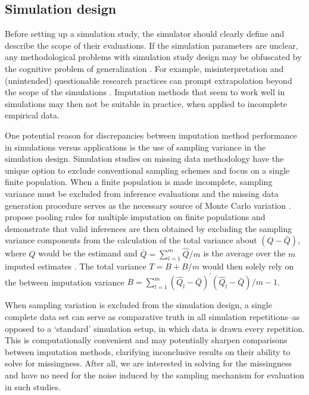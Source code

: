 \documentclass[bimj,fleqn]{w-art}
\begin{document}

\subsection{Simulation design}

Before setting up a simulation study, the simulator should clearly define and describe the scope of their evaluations. If the simulation parameters are unclear, any methodological problems with simulation study design may be obfuscated by the cognitive problem of generalization \citep{gree17}. For example, misinterpretation and (unintended) questionable research practices can prompt extrapolation beyond the scope of the simulations \citep{gree17, pawe22}. Imputation methods that seem to work well in simulations may then not be suitable in practice, when applied to incomplete empirical data.

One potential reason for discrepancies between imputation method performance in simulations versus applications is the use of sampling variance in the simulation design. Simulation studies on missing data methodology have the unique option to exclude conventional sampling schemes and focus on a single finite population. When a finite population is made incomplete, sampling variance must be excluded from inference evaluations and the missing data generation procedure serves as the necessary source of Monte Carlo variation \citep{vink14, raghunathan2003multiple}. \citet{vink14} propose pooling rules for multiple imputation on finite populations and demonstrate that valid inferences are then obtained by excluding the sampling variance components from the calculation of the total variance about $(Q - \bar{Q})$, where $Q$ would be the estimand and $\bar{Q} = \sum_{l=1}^m \hat{Q}/m$ is the average over the $m$ imputed estimates \citep[cf.][p. 76-77]{rubi87}. The total variance $T=B+B/m$ would then solely rely on the between imputation variance $B = \sum_{l=1}^m (\hat{Q}_l - \bar{Q})^\prime(\hat{Q}_l - \bar{Q}) / m-1$. 

When sampling variation is excluded from the simulation design, a single complete data set can serve as comparative truth in all simulation repetitions--as opposed to a `standard' simulation setup, in which data is drawn every repetition. This is computationally convenient and may potentially sharpen comparisons between imputation methods, clarifying inconclusive results on their ability to solve for missingness. After all, we are interested in solving for the missingness and have no need for the noise induced by the sampling mechanism for evaluation in such studies. 
\end{document}
